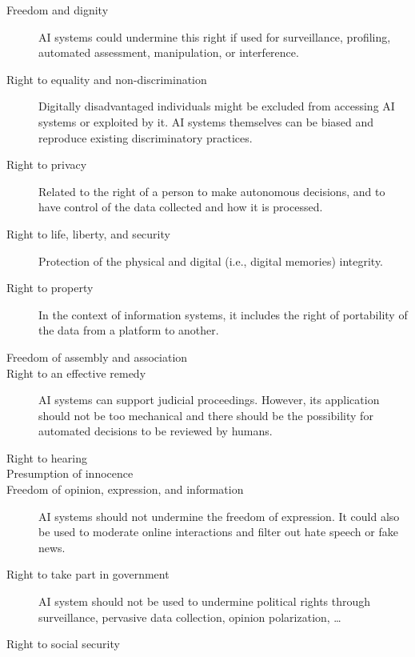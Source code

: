 \begin{description}
    \item[Freedom and dignity] 
        AI systems could undermine this right if used for surveillance, profiling, automated assessment, manipulation, or interference.

    \item[Right to equality and non-discrimination]
        Digitally disadvantaged individuals might be excluded from accessing AI systems or exploited by it. AI systems themselves can be biased and reproduce existing discriminatory practices.

    \item[Right to privacy]
        Related to the right of a person to make autonomous decisions, and to have control of the data collected and how it is processed. 

    \item[Right to life, liberty, and security]
        Protection of the physical and digital (i.e., digital memories) integrity.

    \item[Right to property]
        In the context of information systems, it includes the right of portability of the data from a platform to another.

    \item[Freedom of assembly and association]

    \item[Right to an effective remedy]
        AI systems can support judicial proceedings. However, its application should not be too mechanical and there should be the possibility for automated decisions to be reviewed by humans.

    \item[Right to hearing]
    
    \item[Presumption of innocence]
    
    \item[Freedom of opinion, expression, and information]
        AI systems should not undermine the freedom of expression. It could also be used to moderate online interactions and filter out hate speech or fake news.

    \item[Right to take part in government]
        AI system should not be used to undermine political rights through surveillance, pervasive data collection, opinion polarization, \dots

    \item[Right to social security]
    

\end{description}
